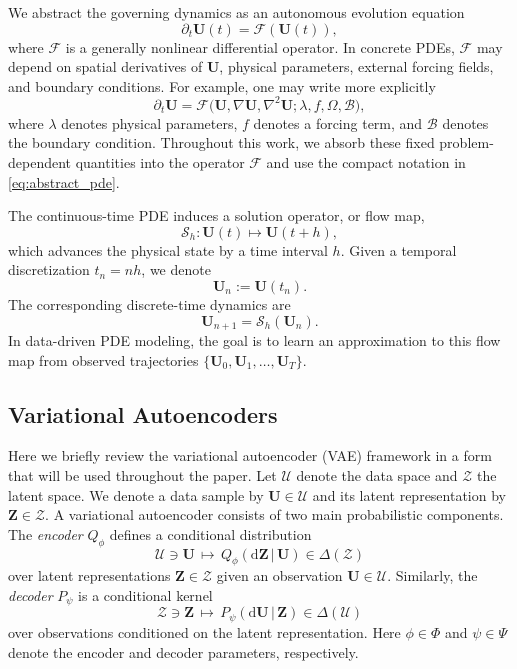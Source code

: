 \documentclass[11pt]{article}
\renewcommand{\d}{\mathrm{d}}
\begin{document}
We abstract the governing dynamics as an autonomous evolution equation
\begin{equation}
    \partial_t \mathbf{U}(t)
    =
    \mathcal{F}(\mathbf{U}(t)),
    \label{eq:abstract_pde}
\end{equation}
where $\mathcal{F}$ is a generally nonlinear differential operator. In concrete
PDEs, $\mathcal{F}$ may depend on spatial derivatives of $\mathbf{U}$, physical
parameters, external forcing fields, and boundary conditions. For example,
one may write more explicitly
\[
    \partial_t \mathbf{U}
    =
    \mathcal{F}
    \bigl(
        \mathbf{U},
        \nabla \mathbf{U},
        \nabla^2 \mathbf{U};
        \lambda, f, \Omega, \mathcal{B}
    \bigr),
\]
where $\lambda$ denotes physical parameters, $f$ denotes a forcing term, and $\mathcal{B}$ denotes the boundary condition. Throughout this work, we absorb these fixed problem-dependent quantities into the operator $\mathcal{F}$ and use the compact notation in \eqref{eq:abstract_pde}.

The continuous-time PDE induces a solution operator, or flow map,
\[
    \mathcal{S}_{h}: \mathbf{U}(t) \mapsto \mathbf{U}(t+h),
\]
which advances the physical state by a time interval $h$. Given a temporal discretization $t_n = nh$, we denote
\[
    \mathbf{U}_n := \mathbf{U}(t_n).
\]
The corresponding discrete-time dynamics are
\begin{equation}
    \mathbf{U}_{n+1}=\mathcal{S}_{h}(\mathbf{U}_n).\label{eq:flow_map}
\end{equation}
In data-driven PDE modeling, the goal is to learn an approximation to this flow map from observed trajectories $\{\mathbf{U}_0,\mathbf{U}_1,\ldots,\mathbf{U}_T\}$.

\subsection{Variational Autoencoders}
\label{sec:vae_review}

Here we briefly review the variational autoencoder (VAE) framework \citep{kingma2013auto, seidman2023variational} in a form that will be used throughout the paper. Let $\mathcal U$ denote the data space and $\mathcal Z$ the latent space. We denote a data sample by $\mathbf U\in\mathcal U$ and its latent representation by $\mathbf Z\in\mathcal Z$. A variational autoencoder consists of two main probabilistic components. The \emph{encoder} $Q_\phi$ defines a conditional distribution
\[
    \mathcal{U}\ni\mathbf U\,\mapsto\, Q_\phi(\d\mathbf Z\,|\,\mathbf U)\in\Delta(\mathcal Z)
\]
over latent representations $\mathbf Z\in\mathcal Z$ given an observation $\mathbf U\in\mathcal U$. Similarly, the \emph{decoder} $P_\psi$ is a conditional kernel
\[
    \mathcal{Z}\ni\mathbf Z\,\mapsto\, P_\psi(\d\mathbf U\,|\,\mathbf{Z})\in\Delta(\mathcal U)
\]
over observations conditioned on the latent representation. Here $\phi\in\Phi$ and $\psi\in\Psi$ denote the encoder and decoder parameters, respectively.
\end{document}
